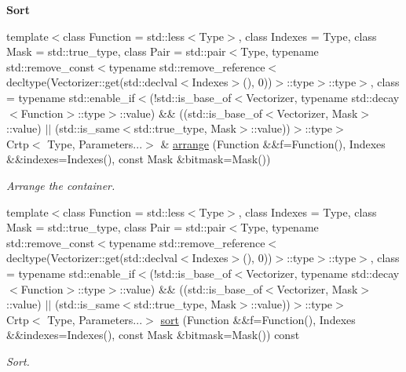 \begin{Indent}{\bf Sort}\par
\begin{DoxyCompactItemize}
\item 
{\footnotesize template$<$class Function  = std\-::less$<$\-Type$>$, class Indexes  = Type, class Mask  = std\-::true\-\_\-type, class Pair  = std\-::pair$<$\-Type, typename std\-::remove\-\_\-const$<$typename std\-::remove\-\_\-reference$<$decltype(\-Vectorizer\-::get(std\-::declval$<$\-Indexes$>$(), 0))$>$\-::type$>$\-::type$>$, class  = typename std\-::enable\-\_\-if$<$(!std\-::is\-\_\-base\-\_\-of$<$\-Vectorizer, typename std\-::decay$<$\-Function$>$\-::type$>$\-::value) \&\& ((std\-::is\-\_\-base\-\_\-of$<$\-Vectorizer, Mask$>$\-::value) $|$$|$ (std\-::is\-\_\-same$<$std\-::true\-\_\-type, Mask$>$\-::value))$>$\-::type$>$ }\\Crtp$<$ Type, Parameters...$>$ \& \hyperlink{classmagrathea_1_1AbstractNArray_a2b471ca82db6d9b73d9d52d39e825f87}{arrange} (Function \&\&f=Function(), Indexes \&\&indexes=Indexes(), const Mask \&bitmask=Mask())
\begin{DoxyCompactList}\small\item\em Arrange the container. \end{DoxyCompactList}\item 
{\footnotesize template$<$class Function  = std\-::less$<$\-Type$>$, class Indexes  = Type, class Mask  = std\-::true\-\_\-type, class Pair  = std\-::pair$<$\-Type, typename std\-::remove\-\_\-const$<$typename std\-::remove\-\_\-reference$<$decltype(\-Vectorizer\-::get(std\-::declval$<$\-Indexes$>$(), 0))$>$\-::type$>$\-::type$>$, class  = typename std\-::enable\-\_\-if$<$(!std\-::is\-\_\-base\-\_\-of$<$\-Vectorizer, typename std\-::decay$<$\-Function$>$\-::type$>$\-::value) \&\& ((std\-::is\-\_\-base\-\_\-of$<$\-Vectorizer, Mask$>$\-::value) $|$$|$ (std\-::is\-\_\-same$<$std\-::true\-\_\-type, Mask$>$\-::value))$>$\-::type$>$ }\\Crtp$<$ Type, Parameters...$>$ \hyperlink{classmagrathea_1_1AbstractNArray_a82c7a90630df5481e60ce14aeb15a4b9}{sort} (Function \&\&f=Function(), Indexes \&\&indexes=Indexes(), const Mask \&bitmask=Mask()) const 
\begin{DoxyCompactList}\small\item\em Sort. \end{DoxyCompactList}\item 

\end{DoxyCompactItemize}
\end{Indent}
